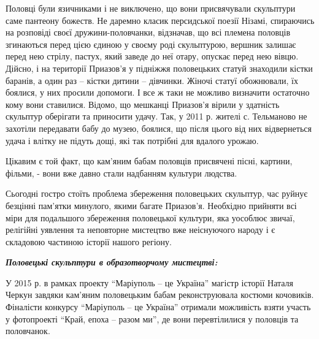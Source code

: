 
Половці були язичниками і не виключено, що вони присвячували скульптури саме
пантеону божеств. Не даремно класик персидської поезії Нізамі, спираючись на
розповіді своєї дружини-половчанки, відзначав, що всі племена половців
згинаються перед цією єдиною у своєму роді скульптурою, вершник залишає перед
нею стрілу, пастух, який заведе до неї отару, опускає перед нею вівцю. Дійсно,
і на території Приазов'я у підніжжя половецьких статуй знаходили кістки
баранів, а один раз – кістки дитини – дівчинки. Жіночі статуї обожнювали, їх
боялися, у них просили допомоги. І все ж таки не можливо визначити остаточно
кому вони ставилися. Відомо, що мешканці Приазов'я вірили у здатність скульптур
оберігати та приносити удачу. Так, у 2011 р. жителі с. Тельманово не захотіли
передавати бабу до музею, боялися, що після цього від них відвернеться удача і
влітку не підуть дощі, які так потрібні для вдалого урожаю.

Цікавим є той факт, що кам'яним бабам половців присвячені пісні, картини,
фільми, - вони вже давно стали надбанням культури людства.


Сьогодні гостро стоїть проблема збереження половецьких скульптур, час руйнує
безцінні пам'ятки минулого, якими багате Приазов'я. Необхідно прийняти всі міри
для подальшого збереження половецької культури, яка уособлює звичаї, релігійні
уявлення та неповторне мистецтво вже неіснуючого народу і є складовою частиною
історії нашого регіону.

\textbf{\em Половецькі скульптури в образотворчому мистецтві:}


У 2015 р. в рамках проекту \enquote{Маріуполь – це Україна} магістр історії Наталя
Черкун завдяки кам'яним половецьким бабам реконструювала костюми кочовиків.
Фіналісти конкурсу \enquote{Маріуполь – це Україна} отримали можливість взяти участь у
фотопроекті \enquote{Край, епоха – разом ми}, де вони перевтілилися у половців та
половчанок.

